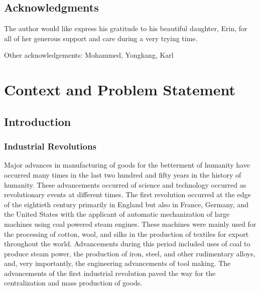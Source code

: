 \documentclass[english]{spimubphdthesis}
\begin{document}
 

\chapter*{Acknowledgments}
The author would like express his gratitude to his beautiful daughter, Erin, for all of her generous support and care during a very trying time.

Other acknowledgements: Mohammed, Yongkang, Karl




 
\tableofcontents

\mainmatter
 
\part{Context and Problem Statement}

\chapter{Introduction}

\section{Industrial Revolutions}
Major advances in manufacturing of goods for the betterment of humanity have occurred many times in the last two hundred and fifty years in the history of humanity.  These advancements occurred of science and technology occurred as revolutionary events at different times.  The first revolution occurred at the edge of the eightieth century primarily in England but also in France, Germany, and the United States with the applicant of automatic mechanization of large machines using coal powered steam engines.  These machines were mainly used for the processing of cotton, wool, and silks in the production of textiles for export throughout the world.  Advancements during this period included uses of coal to produce steam power, the production of iron, steel, and other rudimentary alloys, and, very importantly, the engineering advancements of tool making.  The advancements of the first industrial revolution paved the way for the centralization and mass production of goods.
\end{document}
